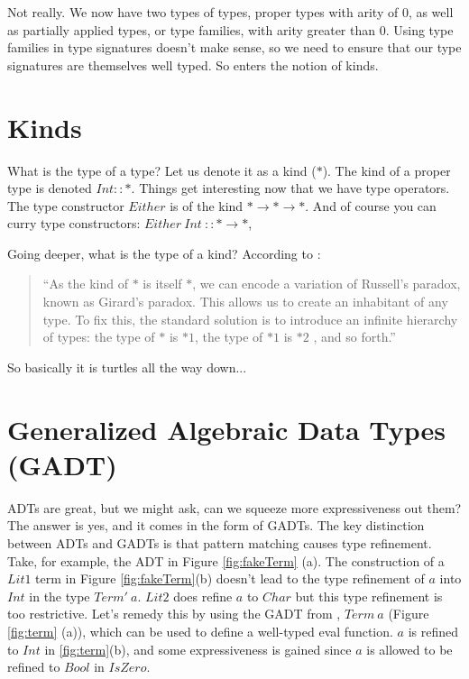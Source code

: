 Not really. We now have two types of types, proper types with arity of 0, as well as partially applied types, or type families, with arity greater than 0. Using type families in type signatures doesn't make sense, so we need to ensure that our type signatures are themselves well typed. So enters the notion of kinds.

\section{Kinds}
What is the type of a type? Let us denote it as a kind ($\ast$). The kind of a proper type is denoted $Int :: \ast $. Things get interesting now that we have type operators. The type constructor $Either$ is of the kind $\ast \rightarrow \ast \rightarrow \ast $. And of course you can curry type constructors: $Either\ Int\ :: \ast \rightarrow \ast $,

Going deeper, what is the type of a kind? According to \cite{lambdaPi}:

\begin{quote}
``As the kind of $\ast$ is itself $\ast$, we can encode a variation of Russell's paradox, known as Girard’s paradox. This allows us to create an inhabitant of any type. To fix this, the standard solution is to introduce an infinite hierarchy of types: the type of $\ast$ is $\ast1$, the type of $\ast1$ is $\ast2$ , and so forth.''
\end{quote}

So basically it is turtles all the way down...

\section{Generalized Algebraic Data Types (GADT)}
ADTs are great, but we might ask, can we squeeze more expressiveness out them? The answer is yes, and it comes in the form of GADTs.  The key distinction between ADTs and GADTs is that pattern matching causes type refinement. Take, for example, the ADT in Figure \ref{fig:fakeTerm} (a). The construction of a $Lit1$ term in Figure \ref{fig:fakeTerm}(b) doesn't lead to the type refinement of $a$ into $Int$ in the type $Term'\ a$. $Lit2$ does refine $a$ to $Char$ but this type refinement is too restrictive. Let's remedy this by using the GADT from \cite{haskellGADT}, $Term\ a$ (Figure \ref{fig:term} (a)), which can be used to define a well-typed eval function.  $a$ is refined to $Int$ in \ref{fig:term}(b), and some expressiveness is gained since $a$ is allowed to be refined to $Bool$ in $IsZero$.

